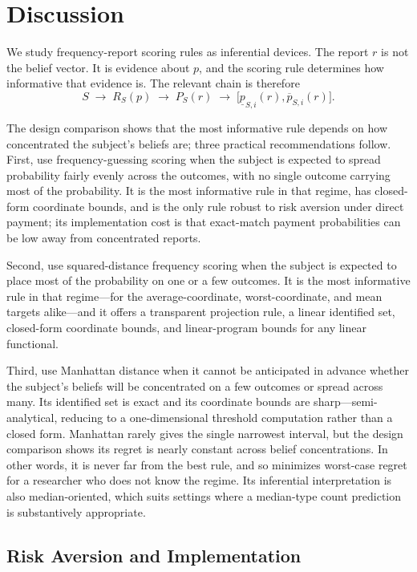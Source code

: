\section{Discussion}

We study frequency-report scoring rules as inferential devices.
The report \(r\) is not the belief vector.
It is evidence about \(p\), and the scoring rule determines how informative that evidence is.
The relevant chain is therefore
\[
S
\;\rightarrow\;
R_S(p)
\;\rightarrow\;
P_S(r)
\;\rightarrow\;
\bigl[\underline p_{S,i}(r),\overline p_{S,i}(r)\bigr].
\]

The design comparison shows that the most informative rule depends on how concentrated the subject's beliefs are; three practical recommendations follow.
First, use frequency-guessing scoring when the subject is expected to spread probability fairly evenly across the outcomes, with no single outcome carrying most of the probability.
It is the most informative rule in that regime, has closed-form coordinate bounds, and is the only rule robust to risk aversion under direct payment; its implementation cost is that exact-match payment probabilities can be low away from concentrated reports.

Second, use squared-distance frequency scoring when the subject is expected to place most of the probability on one or a few outcomes.
It is the most informative rule in that regime---for the average-coordinate, worst-coordinate, and mean targets alike---and it offers a transparent projection rule, a linear identified set, closed-form coordinate bounds, and linear-program bounds for any linear functional.

Third, use Manhattan distance when it cannot be anticipated in advance whether the subject's beliefs will be concentrated on a few outcomes or spread across many.
Its identified set is exact and its coordinate bounds are sharp---semi-analytical, reducing to a one-dimensional threshold computation rather than a closed form.
Manhattan rarely gives the single narrowest interval, but the design comparison shows its regret is nearly constant across belief concentrations.
In other words, it is never far from the best rule, and so minimizes worst-case regret for a researcher who does not know the regime.
Its inferential interpretation is also median-oriented, which suits settings where a median-type count prediction is substantively appropriate.

\subsection{Risk Aversion and Implementation}

